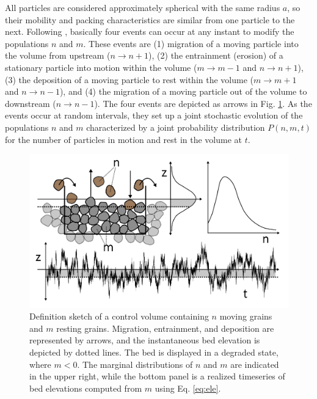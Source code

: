All particles are considered approximately spherical with the same radius $a$, so their mobility and packing characteristics are similar from one particle to the next.
Following \citet{Ancey2008}, basically four events can occur at any instant to modify the populations $n$ and $m$.
These events are (1) migration of a moving particle into the volume from upstream ($n \rightarrow n+1$), (2) the entrainment (erosion) of a stationary particle into motion within the volume ($m\rightarrow m-1$ and $n\rightarrow n+1$), (3) the deposition of a moving particle to rest within the volume ($m\rightarrow m+1$ and $n\rightarrow n-1$), and (4) the migration of a moving particle out of the volume to downstream ($n\rightarrow n-1$).
The four events are depicted as arrows in Fig. \ref{fig:eledefinition}.
As the events occur at random intervals, they set up a joint stochastic evolution of the populations $n$ and $m$ characterized by a joint probability distribution $P(n,m,t)$ for the number of particles in motion and rest in the volume at $t$.
\begin{figure}[!htbp]
	\includegraphics[width=\linewidth,keepaspectratio]{./figures/ch3/improveddef.png}
	\caption{Definition sketch of a control volume containing $n$ moving grains and $m$ resting grains. Migration, entrainment, and deposition are represented by arrows, and the instantaneous bed elevation is depicted by dotted lines. The bed is displayed in a degraded state, where $m<0$. The marginal distributions of $n$ and $m$ are indicated in the upper right, while the bottom panel is a realized timeseries of bed elevations computed from $m$ using Eq. \ref{eq:ele}.}
	\label{fig:eledefinition}
\end{figure}

